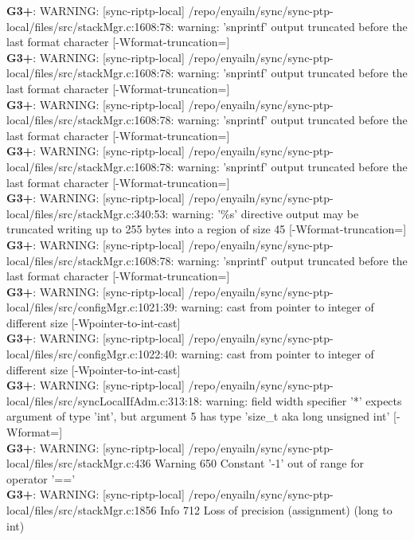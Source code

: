 \documentclass[12pt,twoside]{article}
\begin{document}
\textbf{G3+}: WARNING: [sync-riptp-local] /repo/enyailn/sync/sync-ptp-local/files/src/stackMgr.c:1608:78: warning: 'snprintf' output truncated before the last format character [-Wformat-truncation=]\\ 
\textbf{G3+}: WARNING: [sync-riptp-local] /repo/enyailn/sync/sync-ptp-local/files/src/stackMgr.c:1608:78: warning: 'snprintf' output truncated before the last format character [-Wformat-truncation=]\\ 
\textbf{G3+}: WARNING: [sync-riptp-local] /repo/enyailn/sync/sync-ptp-local/files/src/stackMgr.c:1608:78: warning: 'snprintf' output truncated before the last format character [-Wformat-truncation=]\\ 
\textbf{G3+}: WARNING: [sync-riptp-local] /repo/enyailn/sync/sync-ptp-local/files/src/stackMgr.c:1608:78: warning: 'snprintf' output truncated before the last format character [-Wformat-truncation=]\\ 
\textbf{G3+}: WARNING: [sync-riptp-local] /repo/enyailn/sync/sync-ptp-local/files/src/stackMgr.c:340:53: warning: '\%s' directive output may be truncated writing up to 255 bytes into a region of size 45 [-Wformat-truncation=]\\ 
\textbf{G3+}: WARNING: [sync-riptp-local] /repo/enyailn/sync/sync-ptp-local/files/src/stackMgr.c:1608:78: warning: 'snprintf' output truncated before the last format character [-Wformat-truncation=]\\ 
\textbf{G3+}: WARNING: [sync-riptp-local] /repo/enyailn/sync/sync-ptp-local/files/src/configMgr.c:1021:39: warning: cast from pointer to integer of different size [-Wpointer-to-int-cast]\\ 
\textbf{G3+}: WARNING: [sync-riptp-local] /repo/enyailn/sync/sync-ptp-local/files/src/configMgr.c:1022:40: warning: cast from pointer to integer of different size [-Wpointer-to-int-cast]\\ 
\textbf{G3+}: WARNING: [sync-riptp-local] /repo/enyailn/sync/sync-ptp-local/files/src/syncLocalIfAdm.c:313:18: warning: field width specifier '*' expects argument of type 'int', but argument 5 has type 'size\_t {aka long unsigned int}' [-Wformat=]\\ 
\textbf{G3+}: WARNING: [sync-riptp-local] /repo/enyailn/sync/sync-ptp-local/files/src/stackMgr.c:436 Warning 650 Constant '-1' out of range for operator '=='\\ 
\textbf{G3+}: WARNING: [sync-riptp-local] /repo/enyailn/sync/sync-ptp-local/files/src/stackMgr.c:1856 Info 712 Loss of precision (assignment) (long to int)\\ 
\end{document}
